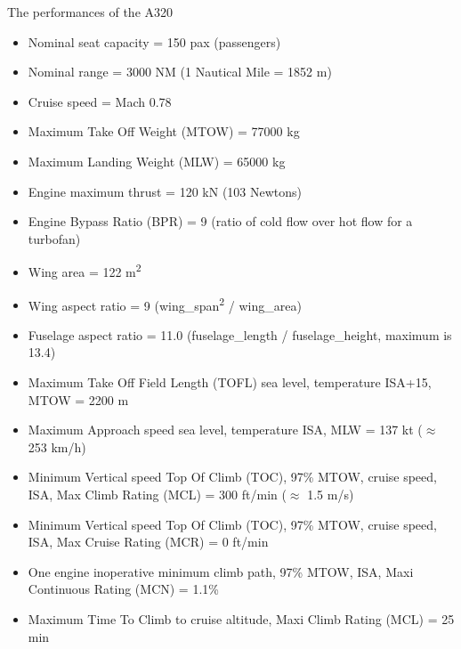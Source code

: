 \documentclass[aspectratio=169]{beamer}
\begin{document}
\begin{frame}{The performances of the A320}
    \footnotesize
    \begin{itemize}
    \item Nominal seat capacity = 150 pax (passengers)
    \item Nominal range = 3000 NM (1 Nautical Mile = 1852 m)
    \item Cruise speed = Mach 0.78
    \item Maximum Take Off Weight (MTOW) = 77000 kg
    \item Maximum Landing Weight (MLW) = 65000 kg
    \item Engine maximum thrust = 120 kN (103 Newtons)
    \item Engine Bypass Ratio (BPR) = 9 (ratio of cold flow over hot flow for a turbofan)
    \item Wing area = 122 m\textsuperscript{2}
    \item Wing aspect ratio = 9 (wing\_span\textsuperscript{2} / wing\_area)
    \item Fuselage aspect ratio = 11.0 (fuselage\_length / fuselage\_height, maximum is 13.4)
    \item Maximum Take Off Field Length (TOFL) sea level, temperature ISA+15, MTOW = 2200 m
    \item Maximum Approach speed sea level, temperature ISA, MLW = 137 kt ($\approx$ 253 km/h)
    \item Minimum Vertical speed Top Of Climb (TOC), 97\% MTOW, cruise speed, ISA, Max Climb Rating (MCL) = 300 ft/min ($\approx$ 1.5 m/s)
    \item Minimum Vertical speed Top Of Climb (TOC), 97\% MTOW, cruise speed, ISA, Max Cruise Rating (MCR) = 0 ft/min
    \item One engine inoperative minimum climb path, 97\% MTOW, ISA, Maxi Continuous Rating (MCN) = 1.1\%
    \item Maximum Time To Climb to cruise altitude, Maxi Climb Rating (MCL) = 25 min
    \end{itemize}
\end{frame}
\end{document}
